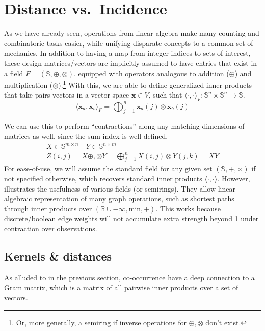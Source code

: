 \documentclass[%
	12pt,
		oneside,
		letterpaper
]{book}
\begin{document}
\section{Distance vs.~Incidence}\label{sec-products}

As we have already seen, operations from linear algebra make many
counting and combinatoric tasks easier, while unifying disparate
concepts to a common set of mechanics. In addition to having a map from
integer indices to sets of interest, these design matrices/vectors are
implicitly assumed to have entries that exist in a field
\(F=(\mathbb{S},\oplus,\otimes)\). equipped with operators analogous to
addition (\(\oplus\)) and multiplication (\(\otimes\)).\footnote{ Or,
  more generally, a semiring if inverse operations for
  \(\oplus,\otimes\) don't exist.} With this, we are able to define
generalized inner products that take pairs vectors in a vector space
\(\mathbf{x}\in V\), such that
\(\langle\cdot,\cdot\rangle_F:\mathbb{S}^n\times \mathbb{S}^n\rightarrow \mathbb{S}\).
\[
\langle\mathbf{x}_a,\mathbf{x}_b\rangle_{F} = \bigoplus_{j=1}^n \mathbf{x}_a(j)\otimes\mathbf{x}_b(j)
\]

We can use this to perform ``contractions'' along any matching
dimensions of matrices as well, since the sum index is well-defined. \[
\begin{aligned}
X\in\mathbb{S}^{m\times n}\quad Y\in\mathbb{S}^{n\times m} \\
Z(i,j)=X\oplus,\otimes Y = \bigoplus_{j=1}^{n} X(i,j) \otimes Y(j,k) = XY
\end{aligned}
\] For ease-of-use, we will assume the standard field for any given set
\((\mathbb{S},+,\times)\) if not specified otherwise, which recovers
standard inner products \(\langle\cdot,\cdot\rangle\). However,
\textcite{MathematicalfoundationsGraphBLAS_Kepner2016} illustrates the
usefulness of various fields (or semirings). They allow linear-algebraic
representation of many graph operations, such as shortest paths through
inner products over \((\mathbb{R}\cup -\infty,\textrm{min}, +)\). This
works because discrete/boolean edge weights will not accumulate extra
strength beyond 1 under contraction over observations.

\subsection{Kernels \& distances}\label{kernels-distances}

As alluded to in the previous section, co-occurrence have a deep
connection to a Gram matrix, which is a matrix of all pairwise inner
products over a set of vectors.
\end{document}

